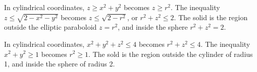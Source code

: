 \EEN
\item 
{}
\BEN
  \item  In cylindrical coordinates, $z \ge x^2+y^2$ becomes $z \ge r^2$. The inequality $z \le \sqrt{2-x^2-y^2}$ becomes $z \le \sqrt{2-r^2}$, or $r^2+z^2\le2$. The solid is the region outside the elliptic paraboloid $z = r^2$, and inside the sphere $r^2+z^2=2$.
  \item  In cylindrical coordinates, $x^2+y^2+z^2\le4$ becomes $r^2+z^2\le4$. The inequality $x^2+y^2 \ge 1$ becomes $r^2 \ge 1$. The sold is the region outside the cylinder of radius 1, and inside the sphere of radius 2. 
\EEN

\EEN
